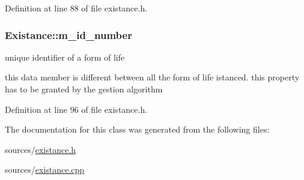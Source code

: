 Definition at line 88 of file existance.h.

\hypertarget{classExistance_a6efaefb1b86cde1108adb1e71f33f84f}{
\subsubsection[{m\_\-id\_\-number}]{ {\bf Existance::m\_\-id\_\-number}}}
\label{classExistance_a6efaefb1b86cde1108adb1e71f33f84f}


unique identifier of a form of life 

this data member is different between all the form of life istanced. this property has to be granted by the gestion algorithm 

Definition at line 96 of file existance.h.



The documentation for this class was generated from the following files:\begin{DoxyCompactItemize}
\item 
sources/\hyperlink{existance_8h}{existance.h}\item 
sources/\hyperlink{existance_8cpp}{existance.cpp}\end{DoxyCompactItemize}

